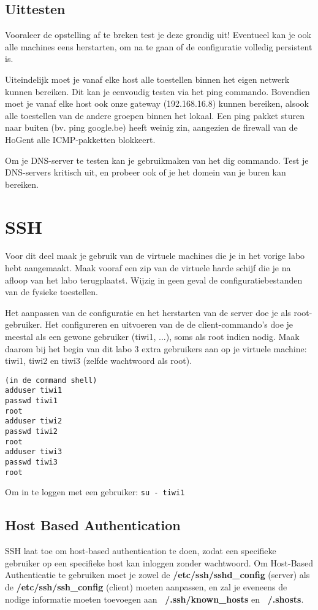 \documentclass{report}
\begin{document}
\section{Uittesten}
 Vooraleer de opstelling af te breken test je deze grondig uit! Eventueel kan je ook alle machines eens herstarten, om na te gaan of de configuratie volledig persistent is.
	
	Uiteindelijk moet je vanaf elke host alle toestellen binnen het eigen netwerk kunnen bereiken. Dit kan je eenvoudig testen via het ping commando. Bovendien moet je vanaf elke host ook onze gateway (192.168.16.8) kunnen bereiken, alsook alle toestellen van de andere groepen binnen het lokaal. Een ping pakket sturen naar buiten (bv. ping google.be) heeft weinig zin, aangezien de firewall van de HoGent alle ICMP-pakketten blokkeert.
	
	Om je DNS-server te testen kan je gebruikmaken van het dig commando. Test je DNS-servers kritisch uit, en probeer ook of je het domein van je buren kan bereiken. 

\chapter{SSH}
 Voor dit deel maak je gebruik van de virtuele machines die je in het vorige labo hebt aangemaakt. Maak vooraf een zip van de virtuele harde schijf die je na afloop van het labo terugplaatst. Wijzig in geen geval de configuratiebestanden van de fysieke toestellen.

Het aanpassen van de configuratie en het herstarten van de server doe je als root-gebruiker.
Het configureren en uitvoeren van de de client-commando's doe je meestal als een gewone gebruiker (tiwi1, ...), soms als root indien nodig. Maak daarom bij het begin van dit labo 3 extra gebruikers aan op je virtuele machine: tiwi1, tiwi2 en tiwi3 (zelfde wachtwoord als root). 
\begin{lstlisting}
(in de command shell)
adduser tiwi1
passwd tiwi1 
root
adduser tiwi2
passwd tiwi2
root
adduser tiwi3
passwd tiwi3
root
\end{lstlisting}
Om in te loggen met een gebruiker: \texttt{su - tiwi1}
\section{Host Based Authentication}
 SSH laat toe om host-based authentication te doen, zodat een specifieke gebruiker op een specifieke host kan inloggen zonder wachtwoord. Om Host-Based Authenticatie te gebruiken moet je zowel de \textbf{/etc/ssh/sshd\_config} (server) als de \textbf{/etc/ssh/ssh\_config} (client) moeten aanpassen, en zal je eveneens de nodige informatie moeten toevoegen aan \textbf{~/.ssh/known\_hosts} en \textbf{~/.shosts}.
\end{document}
